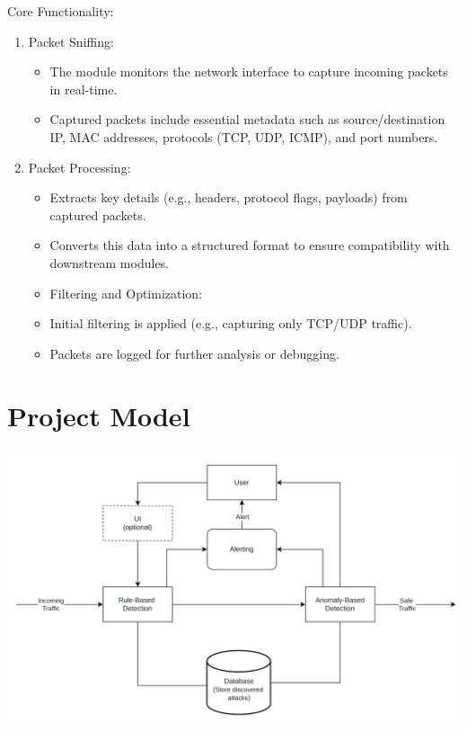 \documentclass[oneside, english]{reports/assets/sdqtechreport}
\begin{document}
Core Functionality:
\begin{enumerate}
	\item Packet Sniffing:
	      \begin{itemize}
		      \item The module monitors the network interface to capture incoming packets in
		            real-time.
		      \item Captured packets include essential metadata such as source/destination IP, MAC
		            addresses, protocols (TCP, UDP, ICMP), and port numbers.
	      \end{itemize}
	\item Packet Processing:
	      \begin{itemize}
		      \item Extracts key details (e.g., headers, protocol flags, payloads) from captured
		            packets.
		      \item Converts this data into a structured format to ensure compatibility with
		            downstream modules.
		      \item Filtering and Optimization:
	      \end{itemize}
	      \begin{itemize}
		      \item Initial filtering is applied (e.g., capturing only TCP/UDP traffic).
		      \item Packets are logged for further analysis or debugging.
	      \end{itemize}
\end{enumerate}

\section{Project Model}
\label{sec:ProjectModel}

\begin{center}
\includegraphics[scale=0.3]{workflow}
\end{center}
\end{document}
